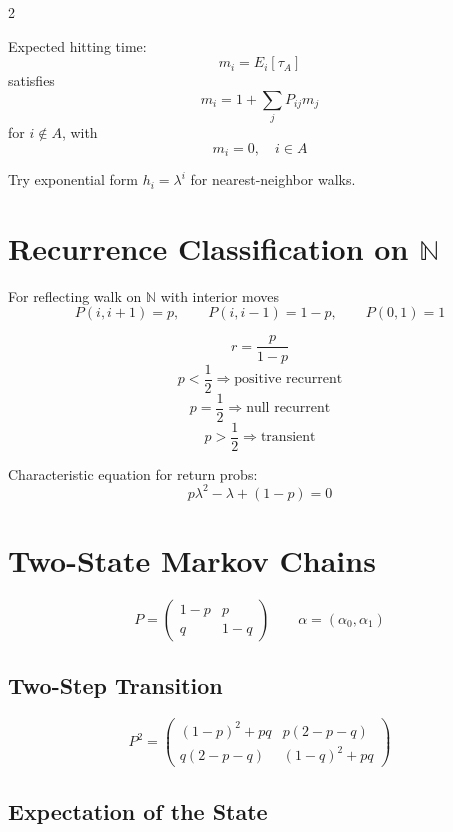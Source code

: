\documentclass[10pt]{article}
\begin{document}
\begin{multicols}{2}
\begin{formulabox}
Expected hitting time:
\[
m_i=E_i[\tau_A]
\]
satisfies
\[
m_i=1+\sum_j P_{ij}m_j
\]
for \(i\notin A\), with
\[
m_i=0,\quad i\in A
\]
\end{formulabox}

Try exponential form \(h_i=\lambda^i\) for nearest-neighbor walks.

\section{Recurrence Classification on \(\mathbb{N}\)}

For reflecting walk on \(\mathbb{N}\) with interior moves
\[
P(i,i+1)=p,\qquad P(i,i-1)=1-p,\qquad P(0,1)=1
\]

\begin{formulabox}
\[
r=\frac{p}{1-p}
\]
\[
p<\frac12 \Rightarrow \text{positive recurrent}
\]
\[
p=\frac12 \Rightarrow \text{null recurrent}
\]
\[
p>\frac12 \Rightarrow \text{transient}
\]
\end{formulabox}

Characteristic equation for return probs:
\[
p\lambda^2-\lambda+(1-p)=0
\]

\section{Two-State Markov Chains}

\[
P=
\begin{pmatrix}
1-p & p\\
q & 1-q
\end{pmatrix}
\qquad
\alpha=(\alpha_0,\alpha_1)
\]

\subsection{Two-Step Transition}

\begin{formulabox}
\[
P^2=
\begin{pmatrix}
(1-p)^2+pq & p(2-p-q)\\
q(2-p-q) & (1-q)^2+pq
\end{pmatrix}
\]
\end{formulabox}

\subsection{Expectation of the State}


\end{multicols}
\end{document}
